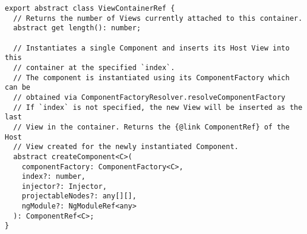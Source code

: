 \begin{verbatim}
export abstract class ViewContainerRef {
  // Returns the number of Views currently attached to this container.
  abstract get length(): number;

  // Instantiates a single Component and inserts its Host View into this
  // container at the specified `index`.
  // The component is instantiated using its ComponentFactory which can be
  // obtained via ComponentFactoryResolver.resolveComponentFactory
  // If `index` is not specified, the new View will be inserted as the last
  // View in the container. Returns the {@link ComponentRef} of the Host
  // View created for the newly instantiated Component.
  abstract createComponent<C>(
    componentFactory: ComponentFactory<C>,
    index?: number,
    injector?: Injector,
    projectableNodes?: any[][],
    ngModule?: NgModuleRef<any>
  ): ComponentRef<C>;
}
\end{verbatim}
